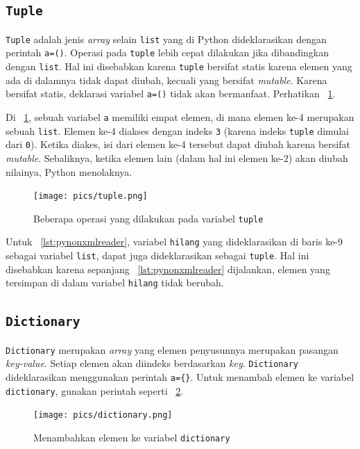 \subsection{\texttt{Tuple}}
\texttt{Tuple} adalah jenis \textit{array} selain \texttt{list} yang di Python dideklarasikan dengan perintah \texttt{a=()}. Operasi pada \texttt{tuple} lebih cepat dilakukan jika dibandingkan dengan \texttt{list}. Hal ini disebabkan karena \texttt{tuple} bersifat statis karena elemen yang ada di dalamnya tidak dapat diubah, kecuali yang bersifat \textit{mutable}. Karena bersifat statis, deklarasi variabel \texttt{a=()} tidak akan bermanfaat. Perhatikan \figurename~\ref{fig:tuple}.

Di \figurename~\ref{fig:tuple}, sebuah variabel \texttt{a} memiliki empat elemen, di mana elemen ke-4 merupakan sebuah \texttt{list}. Elemen ke-4 diakses dengan indeks \texttt{3} (karena indeks \texttt{tuple} dimulai dari \texttt{0}). Ketika diakes, isi dari elemen ke-4 tersebut dapat diubah karena bersifat \textit{mutable}. Sebaliknya, ketika elemen lain (dalam hal ini elemen ke-2) akan diubah nilainya, Python menolaknya. 

\begin{figure}[h!]
  \begin{center}
    \texttt{[image: pics/tuple.png]}
    \caption{Beberapa operasi yang dilakukan pada variabel \texttt{tuple}}
    \label{fig:tuple}
  \end{center}
\end{figure}

Untuk \lstlistingname~\ref{lst:pynonxmlreader}, variabel \texttt{hilang} yang dideklarasikan di baris ke-9 sebagai variabel \texttt{list}, dapat juga dideklarasikan sebagai \texttt{tuple}. Hal ini disebabkan karena sepanjang \lstlistingname~\ref{lst:pynonxmlreader} dijalankan, elemen yang tersimpan di dalam variabel \texttt{hilang} tidak berubah. 
 
\subsection{\texttt{Dictionary}}
\texttt{Dictionary} merupakan \textit{array} yang elemen penyusunnya merupakan pasangan \textit{key-value}. Setiap elemen akan diindeks berdasarkan \textit{key}. \texttt{Dictionary} dideklarasikan menggunakan perintah \texttt{a=\{\}}. Untuk menambah elemen ke variabel \texttt{dictionary}, gunakan perintah seperti \figurename~\ref{fig:dict}.

\begin{figure}[h!]
  \begin{center}
    \texttt{[image: pics/dictionary.png]}
    \caption{Menambahkan elemen ke variabel \texttt{dictionary}}
    \label{fig:dict}
  \end{center}
\end{figure}

